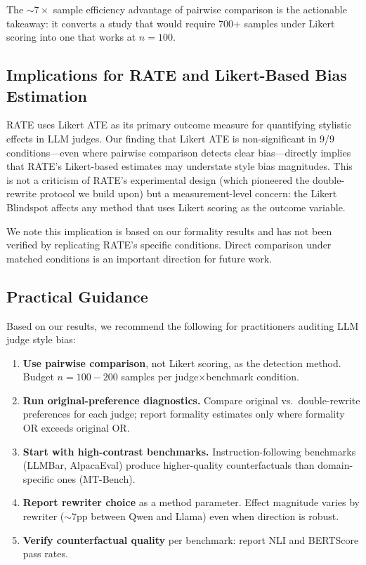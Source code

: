\documentclass[11pt,a4paper]{article}
\begin{document}
The ${\sim}7\times$ sample efficiency advantage of pairwise comparison is the actionable takeaway: it converts a study that would require 700+ samples under Likert scoring into one that works at $n{=}100$.

\subsection{Implications for RATE and Likert-Based Bias Estimation}
\label{sec:discuss_rate}

RATE \cite{rate2025} uses Likert ATE as its primary outcome measure for quantifying stylistic effects in LLM judges.
Our finding that Likert ATE is non-significant in 9/9 conditions---even where pairwise comparison detects clear bias---directly implies that RATE's Likert-based estimates may understate style bias magnitudes.
This is not a criticism of RATE's experimental design (which pioneered the double-rewrite protocol we build upon) but a measurement-level concern: the Likert Blindspot affects any method that uses Likert scoring as the outcome variable.

We note this implication is based on our formality results and has not been verified by replicating RATE's specific conditions.
Direct comparison under matched conditions is an important direction for future work.

\subsection{Practical Guidance}
\label{sec:discuss_practical}

Based on our results, we recommend the following for practitioners auditing LLM judge style bias:

\begin{enumerate}
    \item \textbf{Use pairwise comparison}, not Likert scoring, as the detection method. Budget $n{=}100{-}200$ samples per judge$\times$benchmark condition.
    \item \textbf{Run original-preference diagnostics.} Compare original vs.\ double-rewrite preferences for each judge; report formality estimates only where formality OR exceeds original OR.
    \item \textbf{Start with high-contrast benchmarks.} Instruction-following benchmarks (LLMBar, AlpacaEval) produce higher-quality counterfactuals than domain-specific ones (MT-Bench).
    \item \textbf{Report rewriter choice} as a method parameter. Effect magnitude varies by rewriter (${\sim}7$pp between Qwen and Llama) even when direction is robust.
    \item \textbf{Verify counterfactual quality} per benchmark: report NLI and BERTScore pass rates.
\end{enumerate}
\end{document}
